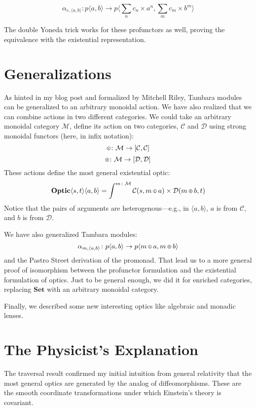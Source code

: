 \documentclass[11pt]{amsart}
\newcommand*\circled[3]
  {\tikz[baseline={([yshift=#2]current bounding box.center)}]{
      \node[shape=circle,draw,inner sep=#1] (char) {#3};}}
\newcommand{\actL}{\mathbin{\circled{0.5pt}{-0.55ex}{\scalebox{0.75}{\tiny{$\mathsf{L}$}}}}}
\newcommand{\actR}{\mathbin{\circled{0.5pt}{-0.55ex}{\scalebox{0.75}{\tiny{$\mathsf{R}$}}}}}
\begin{document}
\[ \alpha_{c, \langle a, b \rangle} \colon p \langle a, b \rangle \to p\langle \sum_n c_n \times a^n, \sum_m c_m \times b^m \rangle \]

The double Yoneda trick works for these profunctors as well, proving the equivalence with the existential representation.

\section{Generalizations}

As hinted in my blog post and formalized by Mitchell Riley, Tambara modules can be generalized to an arbitrary monoidal action. We have also realized that we can combine actions in two different categories. We could take an arbitrary monoidal category $\mathcal{M}$, define its action on two categories, $\mathcal{C}$ and $\mathcal{D}$ using strong monoidal functors (here, in infix notation):
\[ \actL \colon \mathcal{M} \to [\mathcal{C}, \mathcal{C}] \]
\[ \actR \colon \mathcal{M} \to [\mathcal{D}, \mathcal{D}] \]
These actions define the most general existential optic:
\[ \mathbf{Optic} \langle s, t \rangle \langle a, b \rangle = \int^{m \colon \mathcal{M}} \mathcal{C}(s, m \actL a) \times \mathcal{D}(m \actR b, t)\]
Notice that the pairs of arguments are heterogenous---e.g., in $\langle a, b \rangle$, $a$ is from $ \mathcal{C}$, and $b$ is from $ \mathcal{D}$.

We have also generalized Tambara modules:
\[ \alpha_{m, \langle a, b \rangle} \colon p \langle a, b \rangle \to p \langle m \actL a, m \actR b\rangle \]
and the Pastro Street derivation of the promonad. That lead us to a more general proof of isomorphism between the profunctor formulation and the existential formulation of optics. Just to be general enough, we did it for enriched categories, replacing $\mathbf{Set}$ with an arbitrary monoidal category. 

Finally, we described some new interesting optics like algebraic and monadic lenses.

\section{The Physicist's Explanation}

The traversal result confirmed my initial intuition from general relativity that the most general optics are generated by the analog of diffeomorphisms. These are the smooth coordinate transformations under which Einstein's theory is covariant. 
\end{document}

